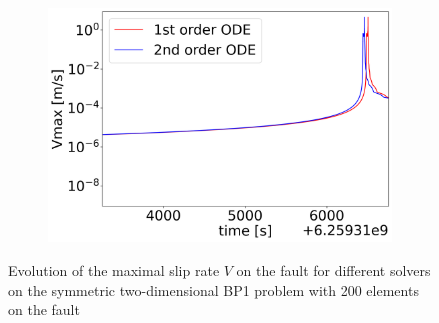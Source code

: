 \begin{figure}[H]
\begin{subfigure}{0.32\textwidth}
    	\includegraphics[width=1\textwidth]{images/TANDEMcompareFormulationstimeEvolutionVearthquake.png}
    \end{subfigure}
    \caption{Evolution of the maximal slip rate $V$ on the fault for different solvers on the symmetric two-dimensional BP1 problem with 200 elements on the fault}
    \label{fig:timeEvolutionTANDEM_V}
\end{figure}



